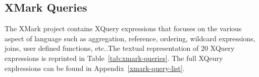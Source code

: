 \subsection{XMark Queries}\label{xmark-queries}
The XMark project contains XQuery expressions that focuses on the various aspect of language such as aggregation, reference, ordering, wildcard expressions, joins, user defined functions, etc.\citep{xmark/mlynkova2008xml}.The textual representation of 20  XQuery expressions is reprinted in  Table~\ref{tab:xmark-queries}. The full XQeury explressions can be found in Appendix~\ref{xmark-query-list}.

